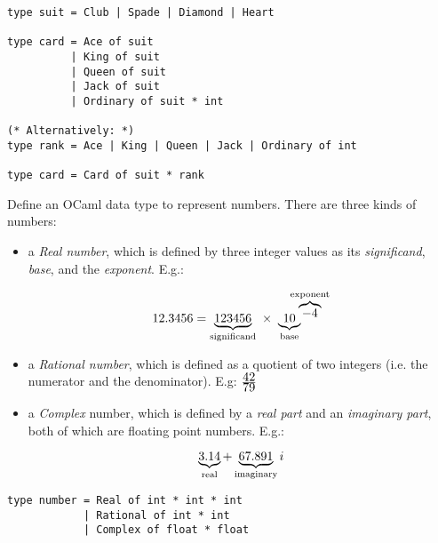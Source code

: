 \documentclass[addpoints]{exam}
\begin{document}
\begin{questions}
  \begin{solutionbox}{6.5cm}
    \begin{verbatim}
type suit = Club | Spade | Diamond | Heart

type card = Ace of suit
          | King of suit
          | Queen of suit
          | Jack of suit
          | Ordinary of suit * int

(* Alternatively: *)
type rank = Ace | King | Queen | Jack | Ordinary of int

type card = Card of suit * rank
    \end{verbatim}
  \end{solutionbox}

  
  \question
  Define an OCaml data type to represent numbers.
  There are three kinds of numbers:
  \begin{itemize}
  \item a \emph{Real number}, which is defined by three integer values as its
    \emph{significand}, \emph{base}, and the \emph{exponent}.
    E.g.:

    $$12.3456 = \underbrace{123456}_\textrm{\scriptsize significand}~\times~\underbrace{10}_\textrm{\scriptsize base}\!\!\!\!\!\!^{\overbrace{-4}^\textrm{\scriptsize exponent}}$$
    
  \item a \emph{Rational number}, which is defined as a quotient of two integers
    (i.e. the numerator and the denominator).
    E.g: $\frac{\textrm{\normalsize 42}}{\textrm{\normalsize 79}}$
    
  \item a \emph{Complex} number, which is defined by a \emph{real part} and an \emph{imaginary part},
    both of which are floating point numbers. E.g.:

    $$ \underbrace{3.14}_\textrm{\scriptsize real} + \underbrace{67.891}_\textrm{\scriptsize imaginary} i$$
    
  \end{itemize}
  
  \begin{solutionbox}{2.5cm}
    \begin{verbatim}
type number = Real of int * int * int
            | Rational of int * int
            | Complex of float * float
    \end{verbatim}
  \end{solutionbox}

  
  \vspace{1em}
  \vspace{1em}


\end{questions}
\end{document}
